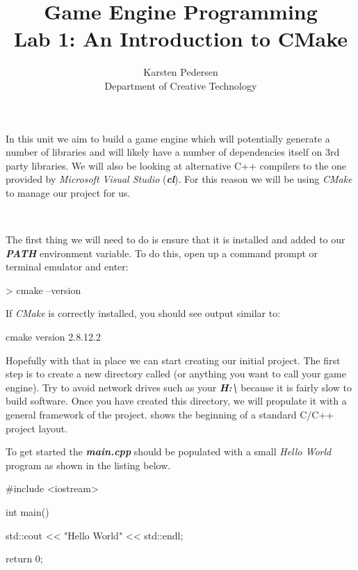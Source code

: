 \documentclass[10pt]{article}
\begin{document}
\title{Game Engine Programming \\
  \large Lab 1: An Introduction to CMake}

\author{Karsten Pedersen\\ Department of Creative Technology}
\maketitle

In this unit we aim to build a game engine which will potentially generate
a number of libraries and will likely have a number of dependencies
itself on 3rd party libraries. We will also be looking at alternative
C++ compilers to the one provided by \textit{Microsoft Visual Studio}
(\textbf{\textit{cl}}). For this reason we will be using \textit{CMake}
to manage our project for us.

\

The first thing we will need to do is ensure that it is installed and
added to our \textbf{\textit{PATH}} environment variable.  To do this,
open up a command prompt or terminal emulator and enter:

\begin{Code}
  > cmake --version
\end{Code}

If \textit{CMake} is correctly installed, you should see output similar to:

\begin{Code}
  cmake version 2.8.12.2
\end{Code}

Hopefully with that in place we can start creating our initial
project. The first step is to create a new directory called
 (or anything you want to call your game engine). Try
to avoid network drives such as your \textbf{\textit{H:\textbackslash}}
because it is fairly slow to build software. Once you have created
this directory, we will propulate it with a general framework of the
project.  shows the beginning of a standard C/C++ project
layout.


To get started the \textbf{\textit{main.cpp}} should be populated with a small \textit{Hello World} program as shown in the listing below.

\begin{Code}
  #include <iostream>

  int main()
  {
    std::cout << "Hello World" << std::endl;

    return 0;
  }
\end{Code}
\end{document}
